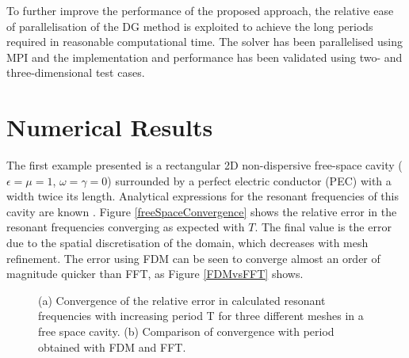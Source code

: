 \documentclass[times,11pt]{ACME2015article}
\begin{document}
To further improve the performance of the proposed approach, the relative ease of parallelisation of the DG method is exploited to achieve the long periods required in reasonable computational time. The solver has been parallelised using MPI and the implementation and performance has been validated using two- and three-dimensional test cases. 


\section{Numerical Results}


The first example presented is a rectangular 2D non-dispersive free-space cavity ($\epsilon = \mu = 1$, $\omega = \gamma = 0$) surrounded by a perfect electric conductor (PEC) with a width twice its length. Analytical expressions for the resonant frequencies of this cavity are known \cite{pozar2006microwave}. Figure \ref{freeSpaceConvergence} shows the relative error in the resonant frequencies converging as expected with $T$. The final value is the error due to the spatial discretisation of the domain, which decreases with mesh refinement. The error using FDM can be seen to converge almost an order of magnitude quicker than FFT, as Figure \ref{FDMvsFFT} shows.


\begin{figure}[htbp!]
 \centering
  
 \caption{ (a) Convergence of the relative error in calculated resonant frequencies with increasing period T for three different meshes in a free space cavity. (b) Comparison of convergence with period obtained with FDM and FFT. }
\end{figure}
\end{document}
